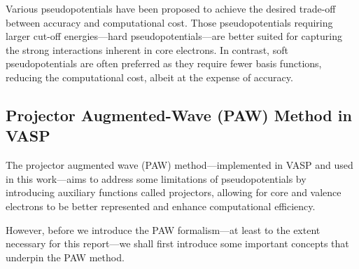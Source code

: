 Various pseudopotentials have been proposed to achieve the desired trade-off between accuracy and computational cost. Those pseudopotentials requiring larger cut-off energies---hard pseudopotentials---are better suited for capturing the strong interactions inherent in core electrons. In contrast, soft pseudopotentials are often preferred as they require fewer basis functions, reducing the computational cost, albeit at the expense of accuracy.

\subsection{Projector Augmented-Wave (PAW) Method in VASP}
The projector augmented wave (PAW) method---implemented in VASP and used in this work---aims to address some limitations of pseudopotentials by introducing auxiliary functions called projectors, allowing for core and valence electrons to be better represented and enhance computational efficiency. 

However, before we introduce the PAW formalism---at least to the extent necessary for this report---we shall first introduce some important concepts that underpin the PAW method.
